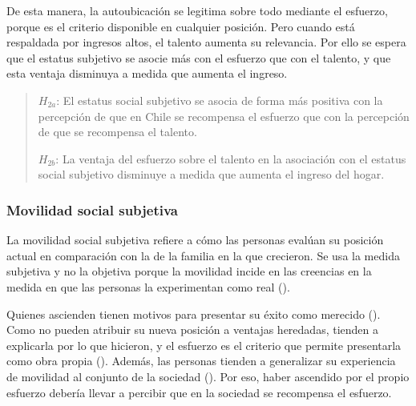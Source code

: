 \documentclass[
  spanish,
  a4paper,
  oneside]{scrbook}
\begin{document}
De esta manera, la autoubicación se legitima sobre todo mediante el
esfuerzo, porque es el criterio disponible en cualquier posición. Pero
cuando está respaldada por ingresos altos, el talento aumenta su
relevancia. Por ello se espera que el estatus subjetivo se asocie más
con el esfuerzo que con el talento, y que esta ventaja disminuya a
medida que aumenta el ingreso.

\begin{quote}
\(H_{2a}\): El estatus social subjetivo se asocia de forma más positiva
con la percepción de que en Chile se recompensa el esfuerzo que con la
percepción de que se recompensa el talento.

\(H_{2b}\): La ventaja del esfuerzo sobre el talento en la asociación
con el estatus social subjetivo disminuye a medida que aumenta el
ingreso del hogar.
\end{quote}

\subsubsection{Movilidad social
subjetiva}\label{movilidad-social-subjetiva-1}

La movilidad social subjetiva refiere a cómo las personas evalúan su
posición actual en comparación con la de la familia en la que crecieron.
Se usa la medida subjetiva y no la objetiva porque la movilidad incide
en las creencias en la medida en que las personas la experimentan como
real ().

Quienes ascienden tienen motivos para presentar su éxito como merecido
(). Como no
pueden atribuir su nueva posición a ventajas heredadas, tienden a
explicarla por lo que hicieron, y el esfuerzo es el criterio que permite
presentarla como obra propia
().
Además, las personas tienden a generalizar su experiencia de movilidad
al conjunto de la sociedad
(). Por eso, haber ascendido por el propio esfuerzo
debería llevar a percibir que en la sociedad se recompensa el esfuerzo.
\end{document}
